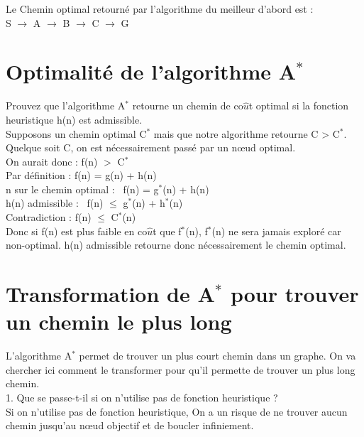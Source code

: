 \documentclass[12pt,a4paper, france]{article}
\newcommand\tab[1][1cm]{\hspace*{#1}}
\begin{document}
Le Chemin optimal retourn\'e par l\textquoteright algorithme du meilleur d\textquoteright abord est : \\
\tab \tab \tab S ${\rightarrow}$ A ${\rightarrow}$ B ${\rightarrow}$ C ${\rightarrow}$ G\\

\section{Optimalit\'e de l\textquoteright algorithme A${^*}$}

Prouvez que l\textquoteright algorithme A${^*}$ retourne un chemin de co${\hat{u}}$t optimal si la fonction heuristique h(n) est admissible. \\

Supposons un chemin optimal C${^*}$ mais que notre algorithme retourne C > C${^*}$. Quelque soit C, on est n\'ecessairement pass\'e par un nœud optimal. \\

On aurait donc : \tab \tab  \;  \;  \; f(n) ${>}$ C${^*}$ \\
\tab Par d\'efinition : \tab \tab \tab f(n) = g(n) + h(n) \\
\tab n sur le chemin optimal : \tab \, f(n) = g${^*}$(n) + h(n) \\
\tab h(n) admissible :  \tab \tab \; \; \, f(n) ${\le}$ g${^*}$(n) + h${^*}$(n) \\
\tab Contradiction : \tab \tab \tab f(n) ${\le}$ C${^*}$(n) \\

Donc si f(n) est plus faible en co${\hat{u}}$t que f${^*}$(n), f${^*}$(n) ne sera jamais explor\'e car non-optimal. h(n) admissible retourne donc n\'ecessairement le chemin optimal.

\section{Transformation de A${^*}$ pour trouver un chemin le plus long}

L\textquoteright algorithme A${^*}$  permet de trouver un plus court chemin dans un graphe. On va chercher ici
comment le transformer pour qu\textquoteright il permette de trouver un plus long chemin. \\

1. Que se passe-t-il si on n\textquoteright utilise pas de fonction heuristique ? \\

Si on n\textquoteright utilise pas de fonction heuristique, On a un risque de ne trouver aucun chemin jusqu'au nœud objectif et de boucler infiniement.\\ 
\end{document}
